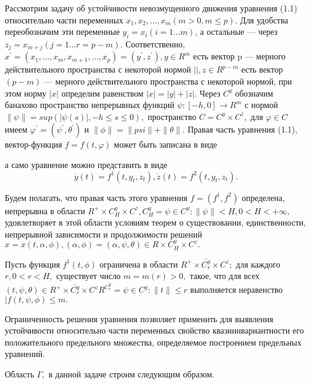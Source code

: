 	Рассмотрим задачу об устойчивости невозмущенного движения уравнения (1.1) относительно части переменных $x_1, x_2, ... , x_m (m > 0, m \le p).$ Для удобства переобозначим эти переменные $y_i = x_i (i = 1...m)$, а остальные --- через $z_j = x_{m+j} (j = 1...r = p - m).$ Соответственно, $x^' = (x_1, ... , x_m, x_{m+1}, ..., x_p) = (y^', z^'), y \in R^m$ есть вектор p --- мерного действительного пространства с некоторой нормой $||, z \in R^{p-m}$ есть вектор $(p-m)$ --- мерного действительного пространства с некоторой нормой, при этом норму $|x|$ определим равенством $|x| = |y| + |z|.$ Через $C^y$ обозначим банахово пространство непрерывных функций $\psi : [-h, 0] \to R^m$ с нормой $\| \psi \| = sup(| \psi(s) |, -h \le s \le 0),$ пространство $C = C^y \times C^z,$ для $\varphi \in C$ имеем $\varphi^' = (\psi^', \theta^')$ и $\| \phi \| = \| psi \| + \| \theta \|.$ Правая часть уравнения (1.1), вектор-функция $f = f(t, \varphi)$ может быть записана в виде
	
	а само уравнение можно представить в виде 
	\begin{equation}
	\dot y(t) = f^1(t, y_t, z_t), \dot z(t) = f^2(t, y_t, z_t).
	\end{equation}
	
	Будем полагать, что правая часть этого уравнения $f = (f^1, f^2)$ определена, непрерывна в области $R^+ \times C^y_H \times C^z, C^y_H = {\psi \in C^y : \| \psi \| < H, 0 < H < +\infty}, $ удовлетворяет в этой области условиям теорем о существовании, единственности, непрерывной зависимости и продолжимости решений $x = x(t, \alpha, \phi), (\alpha, \phi) = (\alpha, \psi, \theta) \in R \times C^y_H \times C^z.$
	
	\begin{Ass}\label{AS1} Пусть функция $f^1(t, \phi)$ ограничена в области $R^+ \times \bar{C_r^y} \times C^z; $ для каждого $r, 0 < r < H,$ существует число $m = m(r) > 0,$ такое, что для всех $(t, \psi, \theta) \in R^+ \times \bar{C_r^y} \times C^z R^ \bar{C_r^y} = {\psi \in C^y : \| t \| \le r}$ выполняется неравенство $| f(t, \psi, \phi) \le m .$
	\end{Ass}
	
	Ограниченность решения уравнения позволяет применить для выявления устойчивости относительно части переменных свойство квазиинвариантности его положительного предельного множества, определяемое построением предельных уравнений.
	
	Область $\Gamma, $ в данной задаче строим следующим образом. 
	
